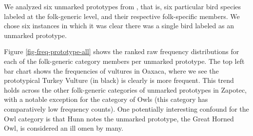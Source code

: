 \documentclass[10pt,letterpaper]{article}
\begin{document}
We analyzed six unmarked prototypes from , that is, six particular bird species labeled at the folk-generic level, and their respective folk-specific members. We chose six instances in which it was clear there was a single bird labeled as an unmarked prototype. 

Figure \ref{fig-freq-prototype-all} shows the ranked raw frequency distributions for each of the folk-generic category members per unmarked prototype. The top left bar chart shows the frequencies of vultures in Oaxaca, where we see the prototypical Turkey Vulture (in black) is clearly is more frequent. This trend holds across the other folk-generic categories of unmarked prototypes in Zapotec, with a notable exception for the category of Owls (this category has comparatively low frequency counts). One potentially interesting confound for the Owl category is that Hunn notes the unmarked prototype, the Great Horned Owl, is considered an ill omen by many. 



\end{document}
